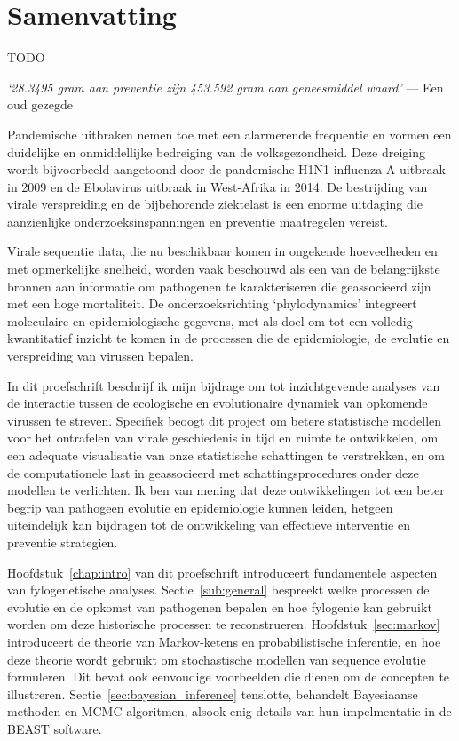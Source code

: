 
\chapter*{Samenvatting}

TODO

\bigskip{}

\emph{`28.3495 gram aan preventie zijn 453.592 gram aan geneesmiddel waard'}
--- Een oud gezegde

\bigskip{}

Pandemische uitbraken nemen toe met een alarmerende frequentie en vormen een duidelijke en onmiddellijke bedreiging van de volksgezondheid.
Deze dreiging wordt bijvoorbeeld aangetoond door de pandemische H1N1 influenza A uitbraak in 2009 en de Ebolavirus uitbraak in West-Afrika in 2014.
De bestrijding van virale verspreiding en de bijbehorende ziektelast is een enorme uitdaging die aanzienlijke onderzoeksinspanningen en preventie maatregelen vereist.

Virale sequentie data, die nu beschikbaar komen in ongekende hoeveelheden en met opmerkelijke snelheid, worden vaak beschouwd als een van de belangrijkste bronnen aan informatie om pathogenen te karakteriseren die geassocieerd zijn met een hoge mortaliteit.
De onderzoeksrichting `phylodynamics' integreert moleculaire en epidemiologische gegevens, met als doel om tot een volledig kwantitatief inzicht te komen in de processen die de epidemiologie, de evolutie en verspreiding van virussen bepalen.

In dit proefschrift beschrijf ik mijn bijdrage om tot inzichtgevende analyses van de interactie tussen de ecologische en evolutionaire dynamiek van opkomende virussen te streven.
Specifiek beoogt dit project om betere statistische modellen voor het ontrafelen van virale geschiedenis in tijd en ruimte te ontwikkelen, om een adequate visualisatie van onze statistische schattingen te verstrekken, en om de computationele last in geassocieerd met schattingsprocedures onder deze modellen te verlichten.
Ik ben van mening dat deze ontwikkelingen tot een beter begrip van pathogeen evolutie en epidemiologie kunnen leiden, hetgeen uiteindelijk kan bijdragen tot de ontwikkeling van effectieve interventie en preventie strategien.

Hoofdstuk~\ref {chap:intro} van dit proefschrift introduceert fundamentele aspecten van fylogenetische analyses.
Sectie~\ref{sub:general} bespreekt welke processen de evolutie en de opkomst van pathogenen bepalen en hoe fylogenie kan gebruikt worden om deze historische processen te reconstrueren.
Hoofdstuk~\ref{sec:markov} introduceert de theorie van Markov-ketens en probabilistische inferentie, en hoe deze theorie wordt gebruikt om stochastische modellen van sequence evolutie formuleren.
Dit bevat ook eenvoudige voorbeelden die dienen om de concepten te illustreren.
Sectie~\ref{sec:bayesian_inference} tenslotte, behandelt Bayesiaanse methoden en MCMC algoritmen, alsook enig details van hun impelmentatie in de BEAST software.

